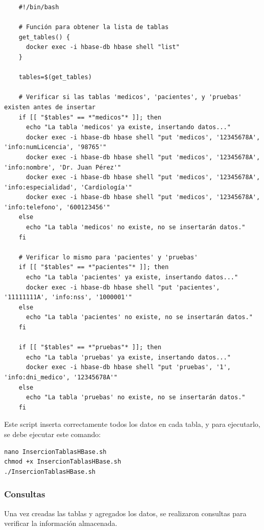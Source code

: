 \documentclass{article}
\begin{document}
\begin{verbatim}
    #!/bin/bash

    # Función para obtener la lista de tablas
    get_tables() {
      docker exec -i hbase-db hbase shell "list"
    }
    
    tables=$(get_tables)
       
    # Verificar si las tablas 'medicos', 'pacientes', y 'pruebas' existen antes de insertar
    if [[ "$tables" == *"medicos"* ]]; then
      echo "La tabla 'medicos' ya existe, insertando datos..."
      docker exec -i hbase-db hbase shell "put 'medicos', '12345678A', 'info:numLicencia', '98765'"
      docker exec -i hbase-db hbase shell "put 'medicos', '12345678A', 'info:nombre', 'Dr. Juan Pérez'"
      docker exec -i hbase-db hbase shell "put 'medicos', '12345678A', 'info:especialidad', 'Cardiología'"
      docker exec -i hbase-db hbase shell "put 'medicos', '12345678A', 'info:telefono', '600123456'"
    else
      echo "La tabla 'medicos' no existe, no se insertarán datos."
    fi
    
    # Verificar lo mismo para 'pacientes' y 'pruebas'
    if [[ "$tables" == *"pacientes"* ]]; then
      echo "La tabla 'pacientes' ya existe, insertando datos..."
      docker exec -i hbase-db hbase shell "put 'pacientes', '11111111A', 'info:nss', '1000001'"
    else
      echo "La tabla 'pacientes' no existe, no se insertarán datos."
    fi
    
    if [[ "$tables" == *"pruebas"* ]]; then
      echo "La tabla 'pruebas' ya existe, insertando datos..."
      docker exec -i hbase-db hbase shell "put 'pruebas', '1', 'info:dni_medico', '12345678A'"
    else
      echo "La tabla 'pruebas' no existe, no se insertarán datos."
    fi
\end{verbatim}

Este script inserta correctamente todos los datos en cada tabla, y para ejecutarlo, se debe ejecutar este comando:

\begin{lstlisting}[style=bashStyle]
nano InsercionTablasHBase.sh
chmod +x InsercionTablasHBase.sh
./InsercionTablasHBase.sh
\end{lstlisting}

\subsubsection{Consultas}

Una vez creadas las tablas y agregados los datos, se realizaron consultas para verificar la información almacenada.
\end{document}
